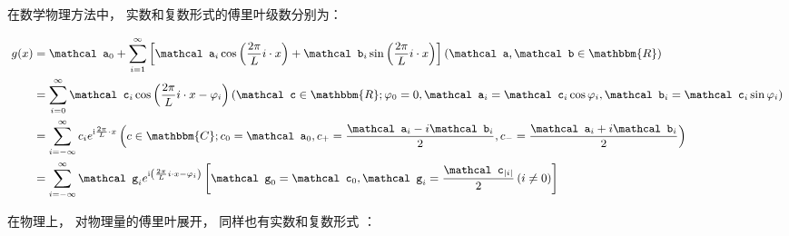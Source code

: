 在数学物理方法中， 实数和复数形式的傅里叶级数分别为：

\begin{theorem}
	\begin{equation}\small
		\begin{split}
				g(x) &= {{\mathcal a}_0} + \sum\limits_{i = 1}^\infty  {\left[ {{{\mathcal a}_i}\cos \left( {\frac{{2\pi }}{L}i \cdot x} \right) + {{\mathcal b}_i}\sin \left( {\frac{{2\pi }}{L}i \cdot x} \right)} \right]} \left( {{\mathcal a},{\mathcal b} \in \mathbbm{R} } \right) \\
				&= \sum\limits_{i = 0}^\infty {{{{\mathcal c}_i}\cos \left( {\frac{{2\pi }}{L}i \cdot x - \varphi_i } \right)}} \left( {{\mathcal c} \in \mathbbm{R} ;
				\varphi_0 = 0 , {{\mathcal a}_i} = {{\mathcal c}_i}\cos \varphi_i, {{\mathcal b}_i} = {{\mathcal c}_i}\sin \varphi_i } \right) \\
				&= \sum\limits_{i = - \infty }^\infty  {{c_i}{e^{{\mathrm i} \frac{2\pi}{L} \cdot x}}} \left( {c \in \mathbbm{C};{c_0} = {{\mathcal a}_0},{c_ + } = \frac{{{{\mathcal a}_i} - i{{\mathcal b}_i}}}{2},{c_ - } = \frac{{{{\mathcal a}_i} + i{{\mathcal b}_i}}}{2}} \right) \\
				&= \sum\limits_{i = - \infty }^\infty  {{\mathcal g}_i {e^{{\mathrm i} \left( {\frac{{2\pi }}{L}i \cdot x - \varphi_i } \right)}}} \left[ {\mathcal g}_0 = {\mathcal c}_0 , {\mathcal g}_i = \frac{{\mathcal c}_{\left| i \right|}}{2} \left( i \neq 0 \right) \right]
		\end{split}
	\end{equation}
\end{theorem}

在物理上， 对物理量的傅里叶展开， 同样也有实数和复数形式 
：

